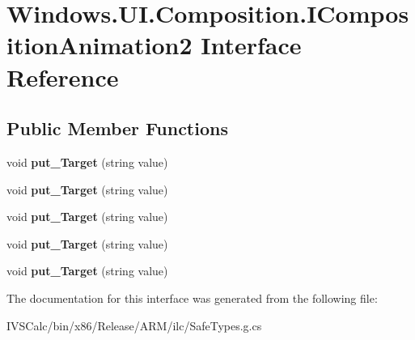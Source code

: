 \hypertarget{interface_windows_1_1_u_i_1_1_composition_1_1_i_composition_animation2}{}\section{Windows.\+U\+I.\+Composition.\+I\+Composition\+Animation2 Interface Reference}
\label{interface_windows_1_1_u_i_1_1_composition_1_1_i_composition_animation2}
\subsection*{Public Member Functions}
\begin{DoxyCompactItemize}
\item 
\mbox{\label{interface_windows_1_1_u_i_1_1_composition_1_1_i_composition_animation2_ab5863e31c67239ca92f7a1a05fddbf34}} 
void {\bfseries put\+\_\+\+Target} (string value)
\item 
\mbox{\label{interface_windows_1_1_u_i_1_1_composition_1_1_i_composition_animation2_ab5863e31c67239ca92f7a1a05fddbf34}} 
void {\bfseries put\+\_\+\+Target} (string value)
\item 
\mbox{\label{interface_windows_1_1_u_i_1_1_composition_1_1_i_composition_animation2_ab5863e31c67239ca92f7a1a05fddbf34}} 
void {\bfseries put\+\_\+\+Target} (string value)
\item 
\mbox{\label{interface_windows_1_1_u_i_1_1_composition_1_1_i_composition_animation2_ab5863e31c67239ca92f7a1a05fddbf34}} 
void {\bfseries put\+\_\+\+Target} (string value)
\item 
\mbox{\label{interface_windows_1_1_u_i_1_1_composition_1_1_i_composition_animation2_ab5863e31c67239ca92f7a1a05fddbf34}} 
void {\bfseries put\+\_\+\+Target} (string value)
\end{DoxyCompactItemize}


The documentation for this interface was generated from the following file\+:\begin{DoxyCompactItemize}
\item 
I\+V\+S\+Calc/bin/x86/\+Release/\+A\+R\+M/ilc/Safe\+Types.\+g.\+cs\end{DoxyCompactItemize}
